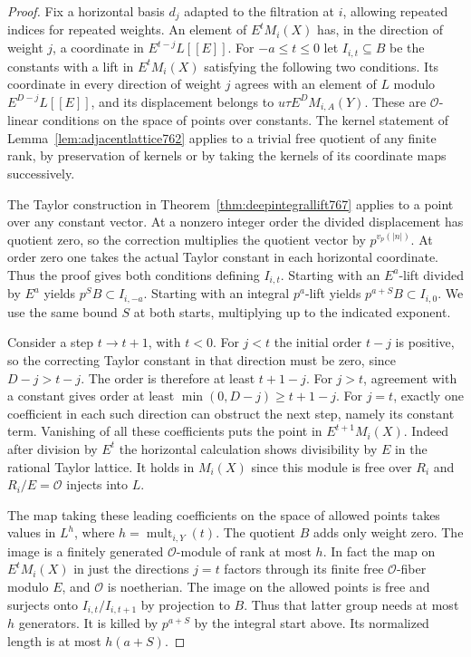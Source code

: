 \documentclass[a4paper,11pt]{article}
\theoremstyle{definition}
\theoremstyle{remark}
\numberwithin{equation}{section}
\begin{document}
\begin{proof}
Fix a horizontal basis \(d_j\) adapted to the filtration
at \(i\), allowing repeated indices for repeated weights.
An element of \(E^tM_i(X)\) has, in the direction of weight
\(j\), a coordinate in \(E^{t-j}L[[E]]\).
For \(-a\le t\le0\) let \(I_{i,t}\subseteq B\) be the constants
with a lift in \(E^tM_i(X)\) satisfying the following two
conditions. Its coordinate in every direction of weight \(j\)
agrees with an element of \(L\) modulo \(E^{D-j}L[[E]]\),
and its displacement belongs to \(u\tau E^DM_{i,A}(Y)\).
These are \(\mathcal O\)-linear conditions on the space of
points over constants. The kernel statement of
Lemma~\ref{lem:adjacentlattice762} applies to a trivial free
quotient of any finite rank, by preservation of kernels or
by taking the kernels of its coordinate maps successively.

The Taylor construction in Theorem~\ref{thm:deepintegrallift767}
applies to a point over any constant vector. At a nonzero
integer order the divided displacement has quotient zero,
so the correction multiplies the quotient vector by
\(p^{v_p(|n|)}\). At order zero one takes the actual Taylor
constant in each horizontal coordinate. Thus the proof gives
both conditions defining \(I_{i,t}\). Starting with an
\(E^a\)-lift divided by \(E^a\) yields \(p^S B\subset I_{i,-a}\).
Starting with an integral \(p^a\)-lift yields
\(p^{a+S}B\subset I_{i,0}\). We use the same bound \(S\)
at both starts, multiplying up to the indicated exponent.

Consider a step \(t\to t+1\), with \(t<0\). For \(j<t\)
the initial order \(t-j\) is positive, so the correcting
Taylor constant in that direction must be zero, since
\(D-j>t-j\). The order is therefore at least \(t+1-j\).
For \(j>t\), agreement with a constant gives order at least
\(\min(0,D-j)\ge t+1-j\). For \(j=t\), exactly one
coefficient in each such direction can obstruct the next
step, namely its constant term. Vanishing of all these
coefficients puts the point in \(E^{t+1}M_i(X)\). Indeed
after division by \(E^t\) the horizontal calculation shows
divisibility by \(E\) in the rational Taylor lattice. It
holds in \(M_i(X)\) since this module is free over \(R_i\)
and \(R_i/E=\mathcal O\) injects into \(L\).

The map taking these leading coefficients on the space
of allowed points takes values in \(L^h\), where
\(h=\operatorname{mult}_{i,Y}(t)\). The quotient \(B\)
adds only weight zero. The image is a finitely generated
\(\mathcal O\)-module of rank at most \(h\). In fact the
map on \(E^tM_i(X)\) in just the directions \(j=t\) factors
through its finite free \(\mathcal O\)-fiber modulo \(E\),
and \(\mathcal O\) is noetherian. The image on the allowed
points is free and surjects onto
\(I_{i,t}/I_{i,t+1}\) by projection to \(B\). Thus that
latter group needs at most \(h\) generators. It is killed
by \(p^{a+S}\) by the integral start above. Its normalized
length is at most \(h(a+S)\).


\end{proof}
\end{document}
